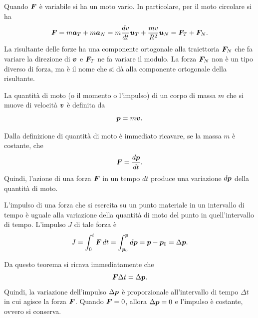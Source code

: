 Quando $\bm{F}$ è variabile si ha un moto vario. In particolare, per il moto circolare si ha
\begin{equation}
    \bm{F}=m\bm{a}_T+m\bm{a}_N=m\frac{dv}{dt}\bm{u}_T+\frac{mv}{R^2}\bm{u}_N=\bm{F}_T+\bm{F}_N.
\end{equation}
La risultante delle forze ha una componente ortogonale alla traiettoria $\bm{F}_N$ che fa variare la direzione di $\bm{v}$ e $\bm{F}_T$ ne fa variare il modulo. 
La forza $\bm{F}_N$ non è un tipo diverso di forza, ma è il nome che si dà alla componente ortogonale della risultante. 
\begin{defn}
    La quantità di moto (o il momento o l'impulso) di un corpo di massa $m$ che si muove di velocità $\bm{v}$ è definita da 
    \begin{equation}
        \bm{p}=m\bm{v}.
    \end{equation}
\end{defn}
Dalla definizione di quantità di moto è immediato ricavare, se la massa $m$ è costante, che
\begin{equation}
    \bm{F}=\frac{d\bm{p}}{dt}.
\end{equation}
Quindi, l'azione di una forza $\bm{F}$ in un tempo $dt$ produce una variazione $d\bm{p}$ della quantità di moto. 
\begin{teo}
    L'impulso di una forza che si esercita su un punto materiale in un intervallo di tempo è uguale alla variazione della quantità di moto del punto in quell'intervallo di tempo. L'impulso $J$ di tale forza è
    \begin{equation}
        J=\int_0^t\bm{F}\,dt=\int_{\bm{p}_0}^{\bm{p}}d\bm{p}=\bm{p}-\bm{p}_0=\Delta\bm{p}.
    \end{equation}
\end{teo}
Da questo teorema si ricava immediatamente che
\begin{equation}
    \bm{F}\Delta t=\Delta\bm{p}.
\end{equation}
Quindi, la variazione dell'impulso $\Delta\bm{p}$ è proporzionale all'intervallo di tempo $\Delta t$ in cui agisce la forza $\bm{F}$. Quando $\bm{F}=0$, allora $\Delta\bm{p}=0$ e l'impulso è costante, ovvero si conserva.
